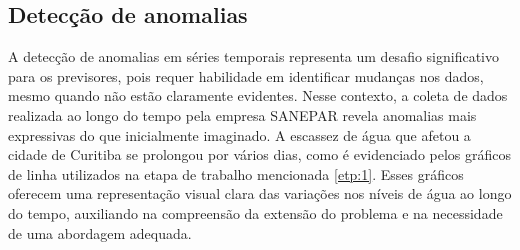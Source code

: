  

\subsection{Detec\c c\~ao de anomalias} \label{subsec:detec}



A detecção de anomalias em séries temporais representa um desafio significativo para os previsores, pois requer habilidade em identificar mudanças nos dados, mesmo quando não estão claramente evidentes. Nesse contexto, a coleta de dados realizada ao longo do tempo pela empresa SANEPAR revela anomalias mais expressivas do que inicialmente imaginado. A escassez de água que afetou a cidade de Curitiba se prolongou por vários dias, como é evidenciado pelos gráficos de linha utilizados na etapa de trabalho mencionada \eqref{etp:1}. Esses gráficos oferecem uma representação visual clara das variações nos níveis de água ao longo do tempo, auxiliando na compreensão da extensão do problema e na necessidade de uma abordagem adequada.


